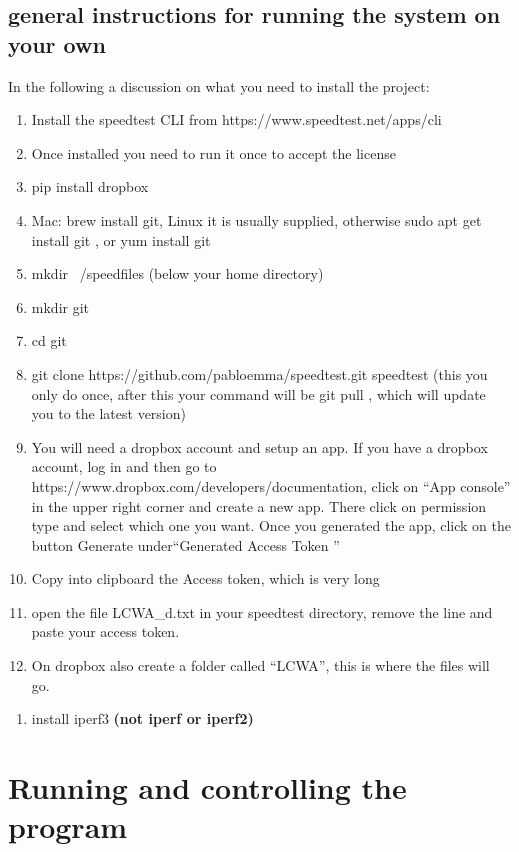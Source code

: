 \documentclass[11pt]{article}
\begin{document}
\subsection{general instructions for running the system on your own}
In the following a discussion on what you need to install the project:
\begin{enumerate}
\item	Install the speedtest CLI from  https://www.speedtest.net/apps/cli
\item Once installed you need to run it once to accept the license
\item pip install dropbox
\item Mac: brew install git, Linux it is usually supplied, otherwise sudo apt get install git , or yum install git
\item mkdir ~/speedfiles (below your home directory)
\item mkdir git
\item cd git
\item git clone https://github.com/pabloemma/speedtest.git speedtest (this you only do once, after this your command will be git pull , which will update you to the latest version)
\item You will need a dropbox account and setup an app. If you have a dropbox account, log in and then go to https://www.dropbox.com/developers/documentation, click on ``App console'' in the upper right corner and create a new app. There click on permission type and select which one you want. Once you generated the app, click on the button Generate under``Generated Access Token ''
\item Copy into clipboard the Access token, which is very long
\item open the file LCWA\_d.txt in your speedtest directory, remove the line and paste your access token.
\item On dropbox also create a folder called ``LCWA'', this is where the files will go.
\end{enumerate}


\begin{enumerate}
\item install iperf3 \textbf{(not iperf or iperf2)}
\end{enumerate}



\section{Running and controlling the program}
\end{document}
